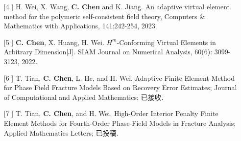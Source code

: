 \begin{itemize}
\begin{itemize}
    \item [[4]]
        H. Wei, X. Wang, \textbf{C. Chen} and K. Jiang.  An adaptive virtual
        element method for the polymeric self-consistent field theory, Computers
        \& Mathematics with Applications, 141:242-254, 2023.

    \item [[5]]
        \textbf{C. Chen}, X. Huang, H. Wei. $H^{m}$-Conforming Virtual
        Elements in Arbitrary Dimension[J]. SIAM Journal on Numerical Analysis,
        60(6): 3099-3123, 2022.
     \item [[6]] T. Tian, \textbf{C. Chen}, L. He, and H. Wei. Adaptive Finite
         Element Method for Phase Field Fracture Models Based on Recovery Error
         Estimates; Journal of Computational and Applied Mathematics; 已接收.
     \item [[7]] T. Tian, \textbf{C. Chen}, and H. Wei. High-Order Interior Penalty
         Finite Element Methods for Fourth-Order Phase-Field Models in Fracture
         Analysis; Applied Mathematics Letters; 已投稿.
    \end{itemize}
\end{itemize}
